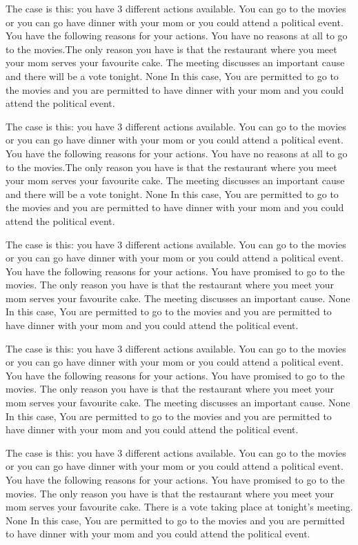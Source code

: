 The case is this: you have  3  different actions available.  You can go to the movies or you can go have dinner with your mom or you could attend a political event.
You have the following reasons for your actions.  You have no reasons at all to go to the movies.The only reason you have is that the restaurant where you meet your mom serves your favourite cake. The meeting discusses an important cause and there will be a vote tonight. 
None
In this case,  You are permitted to go to the movies and you are permitted to have dinner with your mom and you could attend the political event.
 
The case is this: you have  3  different actions available.  You can go to the movies or you can go have dinner with your mom or you could attend a political event.
You have the following reasons for your actions.  You have no reasons at all to go to the movies.The only reason you have is that the restaurant where you meet your mom serves your favourite cake. The meeting discusses an important cause and there will be a vote tonight. 
None
In this case,  You are permitted to go to the movies and you are permitted to have dinner with your mom and you could attend the political event.
 
The case is this: you have  3  different actions available.  You can go to the movies or you can go have dinner with your mom or you could attend a political event.
You have the following reasons for your actions.  You have promised to go to the movies. The only reason you have is that the restaurant where you meet your mom serves your favourite cake. The meeting discusses an important cause. 
None
In this case,  You are permitted to go to the movies and you are permitted to have dinner with your mom and you could attend the political event.
 
The case is this: you have  3  different actions available.  You can go to the movies or you can go have dinner with your mom or you could attend a political event.
You have the following reasons for your actions.  You have promised to go to the movies. The only reason you have is that the restaurant where you meet your mom serves your favourite cake. The meeting discusses an important cause. 
None
In this case,  You are permitted to go to the movies and you are permitted to have dinner with your mom and you could attend the political event.
 
The case is this: you have  3  different actions available.  You can go to the movies or you can go have dinner with your mom or you could attend a political event.
You have the following reasons for your actions.  You have promised to go to the movies. The only reason you have is that the restaurant where you meet your mom serves your favourite cake. There is a vote taking place at tonight's meeting. 
None
In this case,  You are permitted to go to the movies and you are permitted to have dinner with your mom and you could attend the political event.
 
